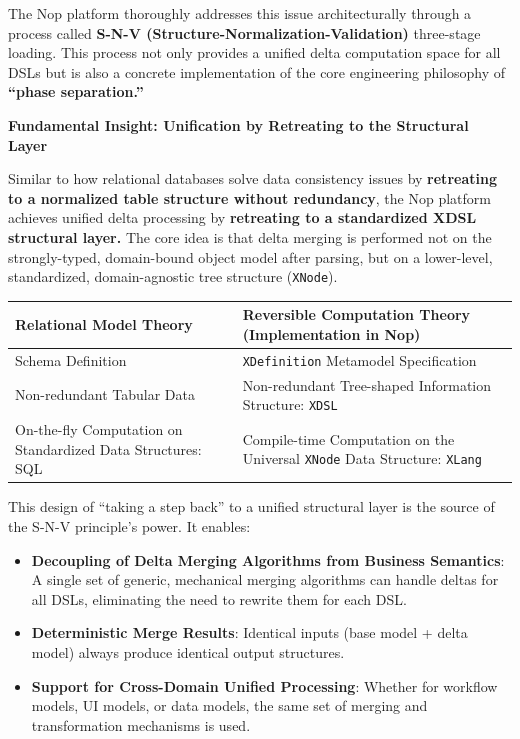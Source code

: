 \documentclass[11pt]{article}
\begin{document}
The Nop platform thoroughly addresses this issue architecturally through a process called \textbf{S-N-V (Structure-Normalization-Validation)} three-stage loading. This process not only provides a unified delta computation space for all DSLs but is also a concrete implementation of the core engineering philosophy of \textbf{``phase separation.''}

\textbf{Fundamental Insight: Unification by Retreating to the Structural Layer}

Similar to how relational databases solve data consistency issues by \textbf{retreating to a normalized table structure without redundancy}, the Nop platform achieves unified delta processing by \textbf{retreating to a standardized XDSL structural layer.} The core idea is that delta merging is performed not on the strongly-typed, domain-bound object model after parsing, but on a lower-level, standardized, domain-agnostic tree structure (\texttt{XNode}).

\begin{center}
\begin{tabular}{|p{}|p{}|}
\hline
\textbf{Relational Model Theory} & \textbf{Reversible Computation Theory (Implementation in Nop)} \\
\hline
Schema Definition & \texttt{XDefinition} Metamodel Specification \\
\hline
Non-redundant Tabular Data & Non-redundant Tree-shaped Information Structure: \texttt{XDSL} \\
\hline
On-the-fly Computation on Standardized Data Structures: SQL & Compile-time Computation on the Universal \texttt{XNode} Data Structure: \texttt{XLang} \\
\hline
\end{tabular}
\end{center}

This design of ``taking a step back'' to a unified structural layer is the source of the S-N-V principle's power. It enables:
\begin{itemize}
\item \textbf{Decoupling of Delta Merging Algorithms from Business Semantics}: A single set of generic, mechanical merging algorithms can handle deltas for all DSLs, eliminating the need to rewrite them for each DSL.
\item \textbf{Deterministic Merge Results}: Identical inputs (base model + delta model) always produce identical output structures.
\item \textbf{Support for Cross-Domain Unified Processing}: Whether for workflow models, UI models, or data models, the same set of merging and transformation mechanisms is used.
\end{itemize}
\end{document}
